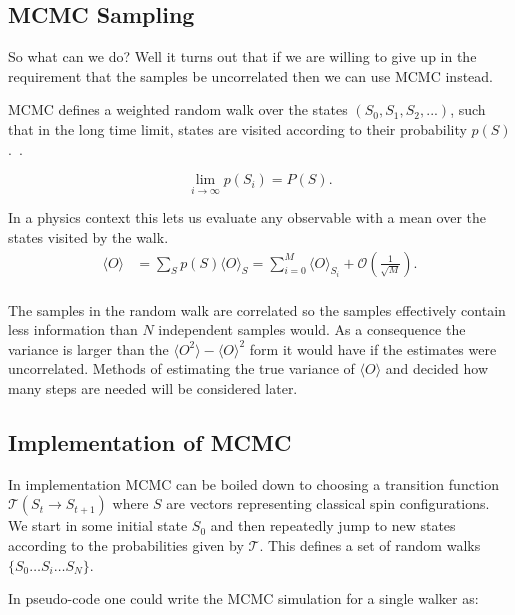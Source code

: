 \hypertarget{mcmc-sampling}{%
\subsection{MCMC Sampling}\label{mcmc-sampling}}

So what can we do? Well it turns out that if we are willing to give up in the requirement that the samples be uncorrelated then we can use MCMC instead.

MCMC defines a weighted random walk over the states \((S_0, S_1, S_2, ...)\), such that in the long time limit, states are visited according to their probability \(p(S)\).~\autocite{binderGuidePracticalWork1988,kerteszAdvancesComputerSimulation1998,wolffMonteCarloErrors2004}. ~\autocite{krauthIntroductionMonteCarlo1998}

\[\lim_{i\to\infty} p(S_i) = P(S).\]

In a physics context this lets us evaluate any observable with a mean over the states visited by the walk. \[\begin{aligned}
\langle O \rangle & = \sum_{S} p(S) \langle O \rangle_{S} = \sum_{i = 0}^{M} \langle O\rangle_{S_i} + \mathcal{O}(\tfrac{1}{\sqrt{M}}).\\
\end{aligned}\]

The samples in the random walk are correlated so the samples effectively contain less information than \(N\) independent samples would. As a consequence the variance is larger than the \(\langle O^2 \rangle - \langle O\rangle^2\) form it would have if the estimates were uncorrelated. Methods of estimating the true variance of \(\langle O \rangle\) and decided how many steps are needed will be considered later.

\hypertarget{implementation-of-mcmc}{%
\subsection{Implementation of MCMC}\label{implementation-of-mcmc}}

In implementation MCMC can be boiled down to choosing a transition function \(\mathcal{T}(S_{t} \rightarrow S_{t+1})\) where \(S\) are vectors representing classical spin configurations. We start in some initial state \(S_0\) and then repeatedly jump to new states according to the probabilities given by \(\mathcal{T}\). This defines a set of random walks \(\{S_0\ldots S_i\ldots S_N\}\).

In pseudo-code one could write the MCMC simulation for a single walker as:

